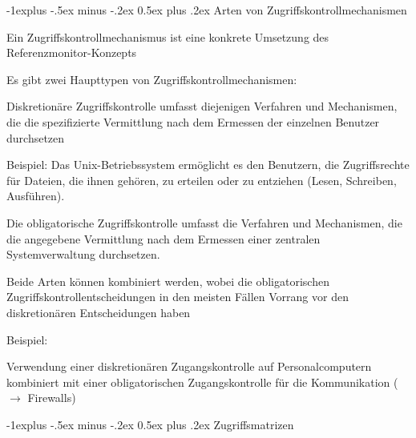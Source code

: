 \documentclass[a4paper]{article}
\makeatletter
\renewcommand{\subsection}{\@startsection{subsection}{2}{0mm}%
 {-1explus -.5ex minus -.2ex}%
 {0.5ex plus .2ex}%
 {\normalfont\normalsize\bfseries}}
\makeatother
\begin{document}
\begin{multicols}{3}
      \subsection{Arten von
            Zugriffskontrollmechanismen}

      \begin{itemize*}
            \item Ein Zugriffskontrollmechanismus ist eine konkrete Umsetzung des
            Referenzmonitor-Konzepts
            \item Es gibt zwei Haupttypen von Zugriffskontrollmechanismen:
            \begin{itemize*}
                  \item Diskretionäre Zugriffskontrolle umfasst diejenigen Verfahren und Mechanismen, die die spezifizierte Vermittlung nach dem Ermessen der einzelnen Benutzer durchsetzen
                  \begin{itemize*}
                        \item Beispiel: Das Unix-Betriebssystem ermöglicht es den Benutzern, die Zugriffsrechte für Dateien, die ihnen gehören, zu erteilen oder zu entziehen (Lesen, Schreiben, Ausführen).
                  \end{itemize*}
                  \item Die obligatorische Zugriffskontrolle umfasst die Verfahren und Mechanismen, die die angegebene Vermittlung nach dem Ermessen einer zentralen Systemverwaltung durchsetzen.
            \end{itemize*}
            \item Beide Arten können kombiniert werden, wobei die obligatorischen
            Zugriffskontrollentscheidungen in den meisten Fällen Vorrang vor den
            diskretionären Entscheidungen haben
            \begin{itemize*}
                  \item Beispiel:
                  \begin{itemize*}
                        \item Verwendung einer diskretionären Zugangskontrolle auf Personalcomputern kombiniert mit einer obligatorischen Zugangskontrolle für die Kommunikation ($\rightarrow$ Firewalls)
                  \end{itemize*}
            \end{itemize*}
      \end{itemize*}


      \subsection{Zugriffsmatrizen}


\end{multicols}
\end{document}
